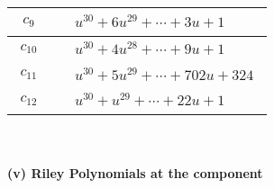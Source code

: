 \documentclass[1p]{elsarticle_modified}
\theoremstyle{definition}
\begin{document}
\begin{tabular}{m{50pt}|m{274pt}}
\hline $$\begin{aligned}c_{9}\end{aligned}$$&$\begin{aligned}
&u^{30}+6 u^{29}+\cdots+3 u+1
\end{aligned}$\\
\hline $$\begin{aligned}c_{10}\end{aligned}$$&$\begin{aligned}
&u^{30}+4 u^{28}+\cdots+9 u+1
\end{aligned}$\\
\hline $$\begin{aligned}c_{11}\end{aligned}$$&$\begin{aligned}
&u^{30}+5 u^{29}+\cdots+702 u+324
\end{aligned}$\\
\hline $$\begin{aligned}c_{12}\end{aligned}$$&$\begin{aligned}
&u^{30}+u^{29}+\cdots+22 u+1
\end{aligned}$\\
\hline
\end{tabular}\\~\\
\newpage\renewcommand{\arraystretch}{1}
\flushleft \textbf{(v) Riley Polynomials at the component}\newline \\
\end{document}
